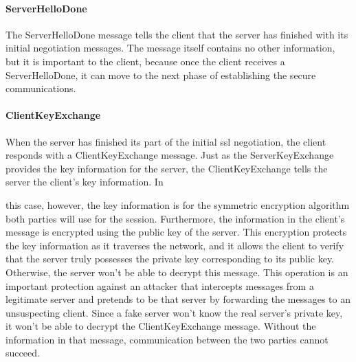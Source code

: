 \paragraph*{ServerHelloDone}
The ServerHelloDone message tells the client that the server has finished with
 its initial negotiation messages. The message itself contains no other 
 information, but it is important to the client, because
once the client receives a ServerHelloDone, it can move to the next
phase of establishing the secure communications.
\paragraph*{ClientKeyExchange}
When the server has finished its part of the initial ssl negotiation,
the client responds with a ClientKeyExchange message. Just as the
ServerKeyExchange provides the key information for the server, the
ClientKeyExchange tells the server the client’s key information. In

this case, however, the key information is for the symmetric encryption 
algorithm both parties will use for the session. Furthermore, the
information in the client’s message is encrypted using the public key
of the server. This encryption protects the key information as it traverses
 the network, and it allows the client to verify that the server
truly possesses the private key corresponding to its public key. Otherwise,
 the server won’t be able to decrypt this message. This operation is an 
 important protection against an attacker that intercepts
messages from a legitimate server and pretends to be that server by
forwarding the messages to an unsuspecting client. Since a fake
server won’t know the real server’s private key, it won’t be able to decrypt 
the ClientKeyExchange message. Without the information in
that message, communication between the two parties cannot succeed.
